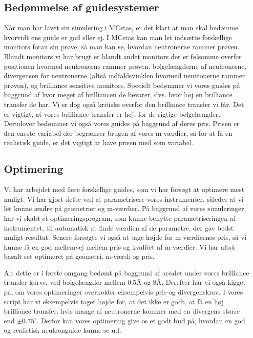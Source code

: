 \documentclass[12pt,oneside,a4paper]{article}
\begin{document}
{{{{{\subsection{Bedømmelse af guidesystemer}

Når man har lavet sin simulering i MCstas, er det klart at man skal bedømme hvorvidt ens guide er god eller ej. I MCstas kan man let indsætte forskellige monitors foran sin prøve, så man kan se, hvordan neutronerne rammer prøven. Blandt monitors vi har brugt er blandt andet monitors der er følsomme overfor positionen hvormed neutronerne rammer prøven, bølgelængderne af neutronerne, divergensen for neutronerne (altså indfaldsvinklen hvormed neutronerne rammer prøven), og brilliance sensitive monitors. Specielt bedømmer vi vores guides på baggrund af hvor meget af brilliancen de bevarer, dvs. hvor høj en brilliance transfer de har. Vi er dog også kritiske overfor den brilliance transfer vi får. Det er vigtigt, at vores brilliance transfer er høj, for de rigtige bølgelængder. Derudover bedømmer vi også vores guides på baggrund af deres pris. Prisen er den eneste variabel der begrænser brugen af vores m-værdier, så for at få en realistisk guide, er det vigtigt at have prisen med som variabel.


\subsection{Optimering}
Vi har arbejdet med flere forskellige guides, som vi har forsøgt at optimere mest muligt. Vi har gjort dette ved at parametrisere vores instrumenter, således at vi let kunne ændre på geometrier og m-værdier. På baggrund af vores simuleringer, har vi skabt et optimeringsprogram, som kunne benytte parametriseringen af instrumentet, til automatisk at finde værdien af de parametre, der gav bedst muligt resultat.
Senere forsøgte vi også at tage højde for m-værdiernes pris, så vi kunne få en god mellemvej mellem pris og kvalitet af m-værdier. Vi har altså basalt set optimeret på geometri, m-værdi og pris. 

Alt dette er i første omgang bedømt på baggrund af arealet under vores brilliance transfer kurve, ved bølgelængder mellem 0.5Å og 8Å. Derefter har vi også kigget på, om vores optimeringer overholder eksempelvis pris-og divergenskrav. I vores script har vi eksempelvis taget højde for, at det ikke er godt, at få en høj brilliance transfer, hvis mange af neutronerne kommer med en divergens større end $\pm0.75^\circ$. Derfor kan vores optimering give os et godt bud på, hvordan en god og realistisk neutronguide kunne se ud. 


}}}}}
\end{document}
